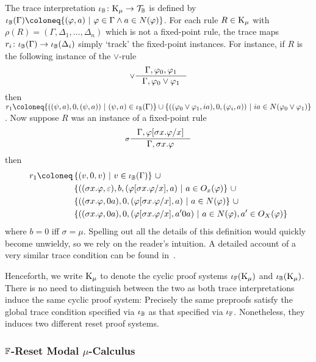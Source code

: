 \begin{definition}\label{def:bb-mu-tc}
  The trace interpretation $\iota_{\mathbb{B}} \colon \mathrm{K}_\mu \to \mathcal{T}_{\mathbb{B}}$ is defined by
  \(\iota_{\BB}(\Gamma) \coloneq \{(\varphi, a) ~|~ \varphi \in \Gamma \wedge a
    \in N(\varphi)\}\). For each rule $R \in \mathrm{K}_\mu$ with $\rho(R) = (\Gamma,
    \Delta_1, \ldots, \Delta_n)$ which is not a fixed-point rule, the trace maps
    $r_i \colon \iota_{\mathbb{B}}(\Gamma) \to \iota_{\mathbb{B}}(\Delta_i)$ simply `track' the
    fixed-point instances. For instance, if $R$ is the following instance of the
    $\vee$-rule
    \[
      \inference[$\vee$]{\Gamma, \varphi_0, \varphi_1}{\Gamma, \varphi_0 \vee \varphi_1}
    \]
    then $r_1 \coloneq \{((\psi, a), 0, (\psi, a)) ~|~ (\psi, a) \in
    \iota_{\BB}(\Gamma)\} \cup \{((\varphi_0 \vee \varphi_1, ia), 0, (\varphi_i,
    a)) ~|~ ia \in N(\varphi_0 \vee \varphi_1)\}$. Now suppose $R$ was an
    instance of a fixed-point rule
    \[
      \inference[$\sigma$]{\Gamma, \varphi[\sigma x. \varphi / x]}{\Gamma, \sigma x. \varphi}
    \]
    then
    \begin{align*}
      r_1 \coloneq\,& \{(v, 0, v) ~|~ v \in \iota_{\BB}(\Gamma)\} ~\cup \\
                   & \{((\sigma x. \varphi, \varepsilon), b, (\varphi[\sigma x. \varphi / x], a) ~|~ a \in O_x(\varphi)\} ~\cup \\ 
                   & \{((\sigma x. \varphi, 0a), 0, (\varphi[\sigma x. \varphi / x], a) ~|~ a \in N(\varphi)\} ~\cup \\
                   & \{((\sigma x. \varphi, 0a), 0, (\varphi[\sigma x. \varphi / x], a'0a) ~|~ a \in N(\varphi), a' \in O_X(\varphi)\}
    \end{align*}
    where $b = 0$ iff $\sigma = \mu$. Spelling out all the details of this
    definition would quickly become unwieldy, so we rely on the reader's
    intuition. A detailed account of a very similar trace condition can be found
    in~\parencite{koriCyclicProofSystem2021}.
\end{definition}

Henceforth, we write $\mathrm{K}_\mu$ to denote the cyclic proof systems $\iota_{\mathbb{F}}(\mathrm{K}_\mu)$
and $\iota_{\mathbb{B}}(\mathrm{K}_\mu)$. There is no need to distinguish between the two as both
trace interpretations induce the same cyclic proof system: Precisely the same
preproofs satisfy the global trace condition specified via $\iota_{\mathbb{B}}$ as that
specified via $\iota_{\mathbb{F}}$. Nonetheless, they induces two different reset proof
systems.

\subsubsection{$\mathbb{F}$-Reset Modal $\mu$-Calculus}
\label{sec:failure-mu}

